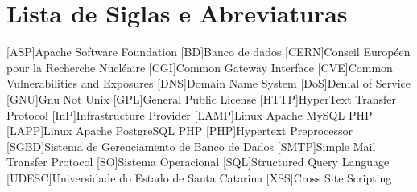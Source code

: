 \chapter*{Lista de Siglas e Abreviaturas}
\begin{acronym}

[ASP]{Apache Software Foundation}
[BD]{Banco de dados}
[CERN]{Conseil Europ\'een pour la Recherche Nucl\'eaire}
[CGI]{Common Gateway Interface}
[CVE]{Common Vulnerabilities and Exposures}
[DNS]{Domain Name System}
[DoS]{Denial of Service}
[GNU]{Gnu Not Unix}
[GPL]{General Public License}
[HTTP]{HyperText Transfer Protocol}
[InP]{Infrastructure Provider}
[LAMP]{Linux Apache MySQL PHP}
[LAPP]{Linux Apache PostgreSQL PHP}
[PHP]{Hypertext Preprocessor}
[SGBD]{Sistema de Gerenciamento de Banco de Dados}
[SMTP]{Simple Mail Transfer Protocol}
[SO]{Sistema Operacional}
[SQL]{Structured Query Language}
[UDESC]{Universidade do Estado de Santa Catarina}
[XSS]{Cross Site Scripting}
\begin{comment}
\acro{CLI}[CLI]{Command Line Interface}
\acro{CPU}[CPU]{Central Processing Unit}
\acro{DPCF}[DPCF]{Data Plane Control Function}
\acro{IETF}[IETF]{Internet Engineering Task Force}
\acro{IO}[I/O]{Input/Output}
\acro{LSD}[LSD]{Link State Database}
\acro{NFS}[NFS]{Network File System}
\acro{ONF}[ONF]{Open Networking Fundation}
\acro{OSPF}[OSPF]{Open Shortest Path First}
\acro{PRNG}[PRNG]{Pseudo-Random Number Generator}
\acro{QOS}[QOS]{Quality of Service}
\acro{RAM}[RAM]{Random Access Memory}
\acro{SDN}[SDN]{Software Defined Network}
\acro{SNMP}[SNMP]{Simple Network Management Protocol}
\end{comment}

\end{acronym}
